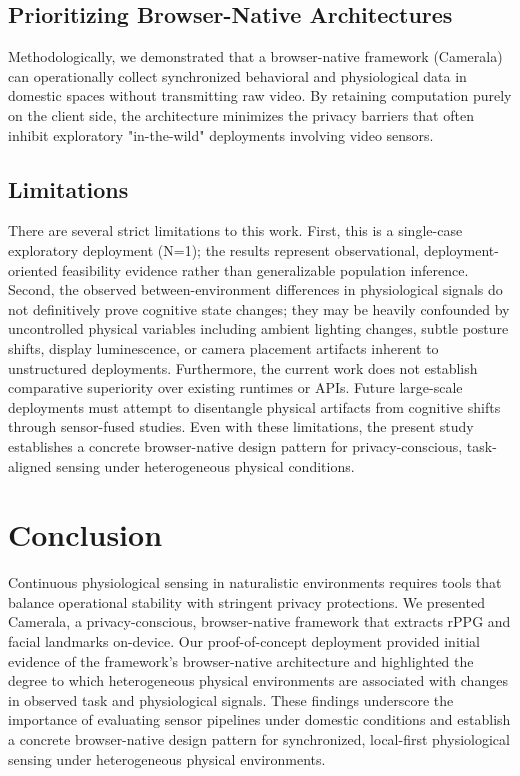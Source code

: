\documentclass[dvipdfmx]{ehis}
\begin{document}
\subsection{Prioritizing Browser-Native Architectures}
Methodologically, we demonstrated that a browser-native framework (Camerala) can operationally collect synchronized behavioral and physiological data in domestic spaces without transmitting raw video. By retaining computation purely on the client side, the architecture minimizes the privacy barriers that often inhibit exploratory "in-the-wild" deployments involving video sensors.

\subsection{Limitations}
There are several strict limitations to this work. First, this is a single-case exploratory deployment (N=1); the results represent observational, deployment-oriented feasibility evidence rather than generalizable population inference. Second, the observed between-environment differences in physiological signals do not definitively prove cognitive state changes; they may be heavily confounded by uncontrolled physical variables including ambient lighting changes, subtle posture shifts, display luminescence, or camera placement artifacts inherent to unstructured deployments. Furthermore, the current work does not establish comparative superiority over existing runtimes or APIs. Future large-scale deployments must attempt to disentangle physical artifacts from cognitive shifts through sensor-fused studies. Even with these limitations, the present study establishes a concrete browser-native design pattern for privacy-conscious, task-aligned sensing under heterogeneous physical conditions.

\section{Conclusion}
Continuous physiological sensing in naturalistic environments requires tools that balance operational stability with stringent privacy protections. We presented Camerala, a privacy-conscious, browser-native framework that extracts rPPG and facial landmarks on-device. Our proof-of-concept deployment provided initial evidence of the framework's browser-native architecture and highlighted the degree to which heterogeneous physical environments are associated with changes in observed task and physiological signals. These findings underscore the importance of evaluating sensor pipelines under domestic conditions and establish a concrete browser-native design pattern for synchronized, local-first physiological sensing under heterogeneous physical environments.
\end{document}
